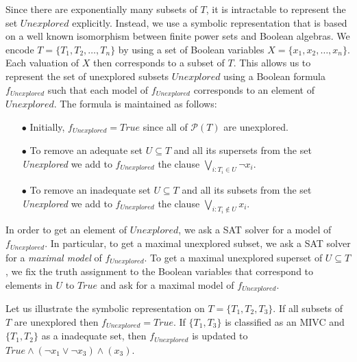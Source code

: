 Since there are exponentially many subsets of $T$, it is intractable to represent the set $\mathit{Unexplored}$ explicitly. Instead, we use a symbolic representation that is based on a well known isomorphism between finite power sets and Boolean algebras. We encode $T = \{T_1, T_2, \ldots , T_n \}$ by using a set of Boolean variables $X = \{x_1, x_2, \ldots , x_n \}$. Each valuation of $X$ then corresponds to a subset of $T$. This allows us to represent the set of unexplored subsets $\mathit{Unexplored}$ using a Boolean formula $f_{\mathit{Unexplored}}$ such that each model of $f_{\mathit{Unexplored}}$ corresponds to an element of $\mathit{Unexplored}$.
The formula is maintained as follows:
\begin{itemize}
	\item[$\bullet$] Initially, $f_{\mathit{Unexplored}} = \mathit{True}$ since all of $\mathcal{P}(T)$ are unexplored.
	
	\smallskip
	\item[$\bullet$] To remove an adequate set $U \subseteq T$ and all its supersets from the set \textit{Unexplored} we add to $f_{\mathit{Unexplored}}$ the clause  $\bigvee_{i: T_i \in U} \neg x_i$.

	\smallskip
	\item[$\bullet$] To remove an inadequate set $U \subseteq T$ and all its subsets from the set \textit{Unexplored} we add to $f_{\mathit{Unexplored}}$ the clause  $\bigvee_{i: T_i \not\in U} x_i$.
\end{itemize}


In order to get an element of $\mathit{Unexplored}$, we ask a SAT solver for a model of $f_{\mathit{Unexplored}}$. In particular, to get a maximal unexplored subset, we ask a SAT solver for a \emph{maximal model} of $f_{\mathit{Unexplored}}$. To get a maximal unexplored superset of $U \subseteq T$, we fix the truth assignment to the Boolean variables that correspond to elements in $U$ to $\mathit{True}$ and ask for a maximal model of $f_{\mathit{Unexplored}}$. 

\begin{example}\label{ex:unex}
Let us illustrate the symbolic representation on $T = \{ T_1, T_2, T_3 \}$. If  all subsets of $T$ are unexplored then $f_{\mathit{Unexplored}} = \mathit{True}$. If   $\{T_1, T_3 \}$ is classified as an MIVC and $\{T_1, T_2 \}$ as a inadequate set, then $f_{\mathit{Unexplored}}$ is updated to $\mathit{True} \wedge (\neg x_1 \vee \neg x_3) \wedge (x_3)$.
\end{example}


